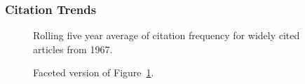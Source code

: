 \documentclass[
  10pt,
  letterpaper,
  DIV=11,
  numbers=noendperiod,
  twoside]{scrartcl}
\begin{document}
\subsubsection*{Citation Trends}\label{sec-trends-1967}

\begin{figure}


\caption{\label{fig-citation-spaghetti-1967}Rolling five year average of
citation frequency for widely cited articles from 1967.}

\end{figure}%

\begin{figure}


\caption{\label{fig-citation-facet-1967}Faceted version of
Figure~\ref{fig-citation-spaghetti-1967}.}

\end{figure}%
\end{document}

